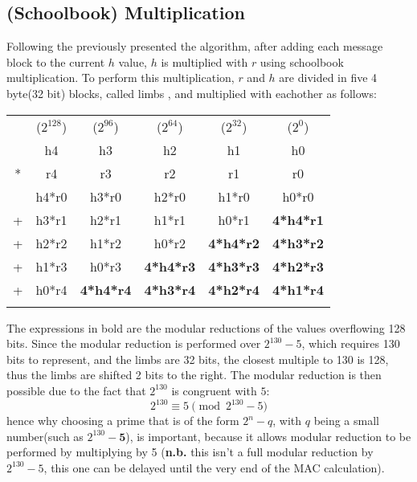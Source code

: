 \documentclass[twocolumn]{article}
\begin{document}
\subsection{(Schoolbook) Multiplication}
Following the previously presented the algorithm, after adding each message block to the current $h$ value, $h$ is multiplied with $r$ using schoolbook multiplication. 
To perform this multiplication, $r$ and $h$ are divided in five 4 byte(32 bit) blocks, called limbs \label{def_limb}, and multiplied with eachother as follows:
\begin{footnotesize}
\begin{tabular}{cccccc}
    & ($2^{128}$)   & ($2^{96}$)    & ($2^{64}$)    & ($2^{32}$)    & ($2^{0}$)     \\
    & h4            & h3            & h2            & h1            & h0            \\
*   & r4            & r3            & r2            & r1            & r0            \\
\hline
    & h4*r0 & h3*r0 & h2*r0 & h1*r0 & h0*r0 \\
+   & h3*r1 & h2*r1 & h1*r1 & h0*r1 & \textbf{4*h4*r1} \\
+   & h2*r2 & h1*r2 & h0*r2 & \textbf{4*h4*r2} & \textbf{4*h3*r2} \\
+   & h1*r3 & h0*r3 & \textbf{4*h4*r3} & \textbf{4*h3*r3} & \textbf{4*h2*r3} \\
+   & h0*r4 & \textbf{4*h4*r4} & \textbf{4*h3*r4} & \textbf{4*h2*r4} & \textbf{4*h1*r4}\\
    &    &    &    &    &    \\
\end{tabular}
\end{footnotesize}
The expressions in bold are the modular reductions of the values overflowing 128 bits. Since the modular reduction is performed over $2^{130}-5$, which requires 130 bits
to represent, and the limbs are 32 bits, the closest multiple to 130 is 128, thus the limbs are shifted 2 bits to the right. The modular reduction is then possible due to 
the fact that $2^{130}$ is congruent with $5$:
$$2^{130} \equiv 5 \pmod{2^{130}-5}$$ 
hence why choosing a prime that is of the form $2^n-q$, with $q$ being a small number(such as $2^{130}-\textbf{5}$), is important, because it allows modular reduction to be 
performed by multiplying by 5 (\textbf{n.b.} this isn't a full modular reduction by $2^{130}-5$, this one can be delayed until the very end of the MAC calculation).
\end{document}
